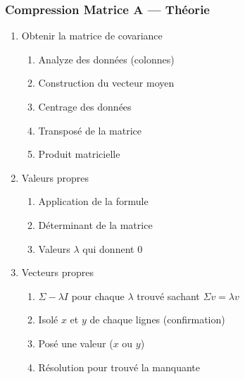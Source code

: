 \begin{frame}
    \frametitle{Compression Matrice A — Théorie}
    \begin{enumerate}
        \item Obtenir la matrice de covariance
        \begin{enumerate}
            \item Analyze des données (colonnes)
            \item Construction du vecteur moyen
            \item Centrage des données
            \item Transposé de la matrice
            \item Produit matricielle
        \end{enumerate}
        \item Valeurs propres
        \begin{enumerate}
            \item Application de la formule
            \item Déterminant de la matrice
            \item Valeurs $\lambda$ qui donnent $0$
        \end{enumerate}
        \item Vecteurs propres
        \begin{enumerate}
            \item $\Sigma-\lambda I$ pour chaque $\lambda$ trouvé sachant $\Sigma v=\lambda v$
            \item Isolé $x$ et $y$ de chaque lignes (confirmation)
            \item Posé une valeur ($x$ ou $y$)
            \item Résolution pour trouvé la manquante
        \end{enumerate}
    \end{enumerate}
\end{frame}


